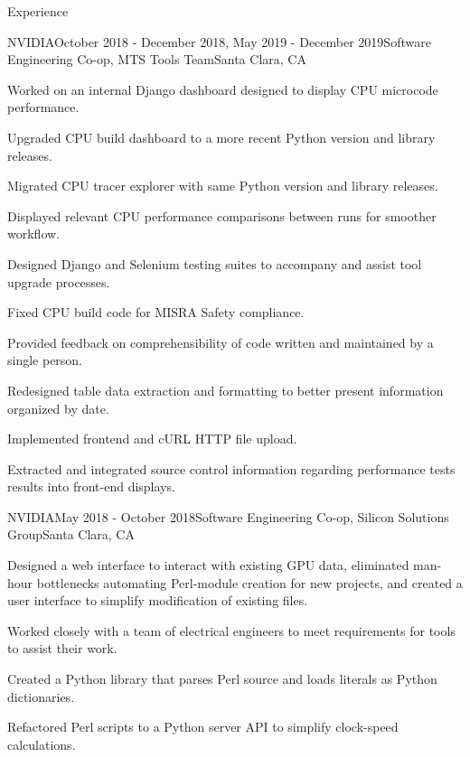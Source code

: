 \documentclass{resume}
\begin{document}
  \begin{rSection}{Experience}
  
        \begin{rSubsection}{NVIDIA}{October 2018 - December 2018, May 2019 - December 2019}{Software Engineering Co-op, MTS Tools Team}{Santa Clara, CA}
    \item Worked on an internal Django dashboard designed to display CPU microcode performance.
    \item Upgraded CPU build dashboard to a more recent Python version and library releases.
    \item Migrated CPU tracer explorer with same Python version and library releases.
    \item Displayed relevant CPU performance comparisons between runs for smoother workflow.
    \item Designed Django and Selenium testing suites to accompany and assist tool upgrade processes.
    \item Fixed CPU build code for MISRA Safety compliance.
 
    \item Provided feedback on comprehensibility of code written and maintained by a single person.
    \item Redesigned table data extraction and formatting to better present information organized by date.
    \item Implemented frontend and cURL HTTP file upload.
    \item Extracted and integrated source control information regarding performance tests results into front-end displays.
 \end{rSubsection}
 
    \begin{rSubsection}{NVIDIA}{May 2018 - October 2018}{Software Engineering Co-op, Silicon Solutions Group}{Santa Clara, CA}
    \item Designed a web interface to interact with existing GPU data, eliminated man-hour bottlenecks automating Perl-module creation for new projects, and created a user interface to simplify modification of existing files.
    \item Worked closely with a team of electrical engineers to meet requirements for tools to assist their work.
    \item Created a Python library that parses Perl source and loads literals as Python dictionaries.
    \item Refactored Perl scripts to a Python server API to simplify clock-speed calculations.
    \end{rSubsection}


\end{rSection}
\end{document}
